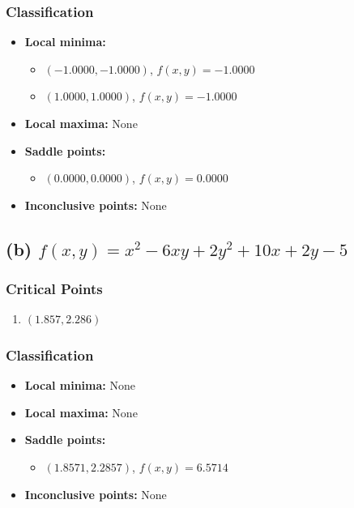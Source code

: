 \documentclass[12pt]{article}
\begin{document}
\subsubsection*{Classification}
\begin{itemize}
    \item \textbf{Local minima:}
    \begin{itemize}
        \item \((-1.0000, -1.0000)\), \( f(x,y) = -1.0000 \)
        \item \((1.0000, 1.0000)\), \( f(x,y) = -1.0000 \)
    \end{itemize}
    \item \textbf{Local maxima:} None
    \item \textbf{Saddle points:}
    \begin{itemize}
        \item \((0.0000, 0.0000)\), \( f(x,y) = 0.0000 \)
    \end{itemize}
    \item \textbf{Inconclusive points:} None
\end{itemize}

\hrulefill
\newpage


\subsection*{(b) \( f(x, y) = x^2 - 6xy + 2y^2 + 10x + 2y - 5 \)}

\subsubsection*{Critical Points}
\begin{enumerate}
    \item \((1.857, 2.286)\)
\end{enumerate}

\subsubsection*{Classification}
\begin{itemize}
    \item \textbf{Local minima:} None
    \item \textbf{Local maxima:} None
    \item \textbf{Saddle points:}
    \begin{itemize}
        \item \((1.8571, 2.2857)\), \( f(x,y) = 6.5714 \)
    \end{itemize}
    \item \textbf{Inconclusive points:} None
\end{itemize}
\end{document}
